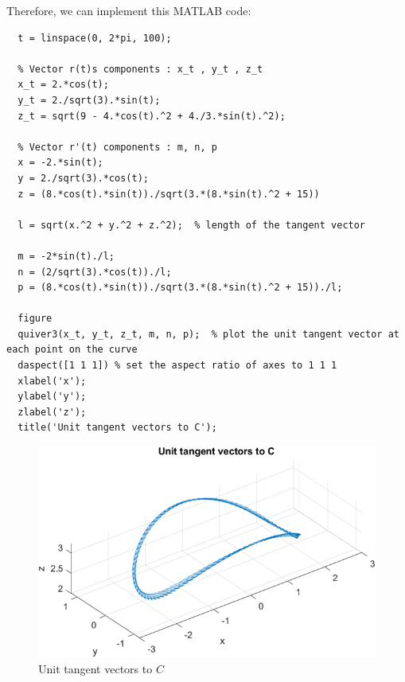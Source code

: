 Therefore, we can implement this MATLAB code:
\begin{lstlisting}[style=Matlab-editor]
  % Plot the unit tangent vector at anypoint on the curve C
  t = linspace(0, 2*pi, 100);
  
  % Vector r(t)s components : x_t , y_t , z_t
  x_t = 2.*cos(t);
  y_t = 2./sqrt(3).*sin(t);
  z_t = sqrt(9 - 4.*cos(t).^2 + 4./3.*sin(t).^2);
  
  % Vector r'(t) components : m, n, p
  x = -2.*sin(t);
  y = 2./sqrt(3).*cos(t);
  z = (8.*cos(t).*sin(t))./sqrt(3.*(8.*sin(t).^2 + 15))
  
  l = sqrt(x.^2 + y.^2 + z.^2);  % length of the tangent vector
  
  m = -2*sin(t)./l;
  n = (2/sqrt(3).*cos(t))./l;
  p = (8.*cos(t).*sin(t))./sqrt(3.*(8.*sin(t).^2 + 15))./l;
  
  figure
  quiver3(x_t, y_t, z_t, m, n, p);  % plot the unit tangent vector at each point on the curve
  daspect([1 1 1]) % set the aspect ratio of axes to 1 1 1
  xlabel('x');
  ylabel('y');
  zlabel('z');
  title('Unit tangent vectors to C');
\end{lstlisting}

\begin{figure}[H]
  \centering
  \includegraphics[width=12cm]{graphics/3c.png}
  \caption{Unit tangent vectors to $C$}
\end{figure}

\vspace*{1cm}

